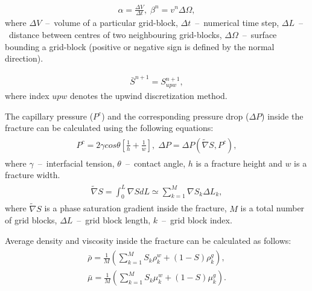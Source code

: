 \documentclass[a4paper,12pt]{extreport}
\begin{document}
  \begin{eqnarray}
  \label{eq:twophase_alpha_beta}
  \alpha = \frac{\Delta V}{\Delta t}, \;
  \beta^n = v^n\Delta \Omega,
  \end{eqnarray}
  where $\Delta V$~--~volume of a particular grid-block, $\Delta t$~--~numerical time step, $\Delta L$~--~distance between centres of two neighbouring grid-blocks, $\Delta \Omega$~--~surface bounding a grid-block (positive or negative sign is defined by the normal direction).

\begin{eqnarray}
\label{eq:twophase_delta_num}
\bar{S}^{n+\mathit 1} = S_{upw}^{n+\mathit{1}},
\end{eqnarray}
 where index $upw$ denotes the upwind discretization method.
 
 The capillary pressure ($P^c$)  and the corresponding pressure drop ($\Delta P$) inside the fracture can be calculated using the following equations:
  \begin{eqnarray}
  \begin{gathered}
  \label{eq:twophase_capillary_pressure_fractures}
  P^{c} = 2 \gamma cos \theta \left[\frac{1}{h} + \frac{1}{w}\right], \; \Delta P = \Delta P \left(\tilde{\nabla} S, P^c\right),
  \end{gathered}
  \end{eqnarray}
  where $\gamma$~--~interfacial tension, $\theta$~--~contact angle, $h$ is a fracture height and $w$ is a fracture width.
  \begin{eqnarray}
  \label{eq:twophase_av_saturation_grad}
  \begin{gathered}
  \tilde{\nabla} S = \int_{0}^{L} \nabla S dL \simeq\sum_{k=1}^{M} \nabla S_{k} \Delta L_{k},
  \end{gathered}
  \end{eqnarray}
 where $\tilde{\nabla} S$ is a phase saturation gradient inside the fracture, $M$ is a total number of grid blocks, $\Delta L$~--~grid block length, $k$~--~grid block index.
 
 
Average density and viscosity inside the fracture can be calculated as follows:
  \begin{eqnarray}
  \label{eq:twophase_dens_visc}
  \begin{gathered}
  \bar{\rho} = \frac{1}{M}\left(\sum_{k=1}^M S_{k} \rho_k^w+ \left(1-S\right) \rho_k^g\right), \\
  \bar{\mu} = \frac{1}{M}\left(\sum_{k=1}^M S_{k} \mu_k^w+ \left(1-S\right) \mu_k^g\right).
  \end{gathered}
  \end{eqnarray}
\end{document}
